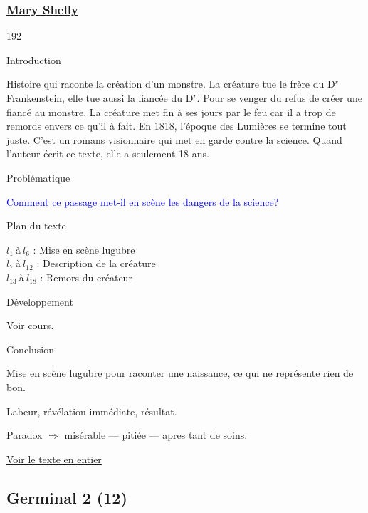 \documentclass[12pt,a4paper]{article}
\begin{document}
				\subsubsection{\href{.extra/Bio/Shelly.pdf}{Mary Shelly}}
\begin{dingautolist}{192}

\item Introduction \par
Histoire qui raconte la création d'un monstre. La créature tue le frère du D$^r$ Frankenstein, elle tue aussi la fiancée du D$^r$. Pour se venger du refus de créer une fiancé au monstre. La créature met fin à ses jours par le feu car il a trop de remords envers ce qu'il à fait. En 1818, l'époque des Lumières se termine tout juste. C'est un romans visionnaire qui met en garde contre la science. Quand l'auteur écrit ce texte, elle a seulement 18 ans.
\item Probl\'ematique \par
	\textcolor{blue}{Comment ce passage met-il en scène les dangers de la science?}
\item Plan du texte \par
	$l_{1}~$\`a$~l_{6}$ : Mise en scène lugubre\\
    $l_{7}~$\`a$~l_{12}$ : Description de la créature\\
    $l_{13}~$\`a$~l_{18}$ : Remors du créateur


\item D\'eveloppement \par
        Voir cours.

\item Conclusion \par
Mise en scène lugubre pour raconter une naissance, ce qui ne représente rien de bon.\par
Labeur, révélation immédiate, résultat.\par
Paradox $\Rightarrow$ misérable --- pitiée --- apres tant de soins.


\end{dingautolist}
\href{.extra/Textes/Frankenstein.pdf}{Voir le texte en entier}


\newpage
\subsection{Germinal 2 (12)}
\end{document}
